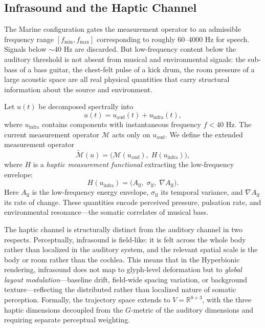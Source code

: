 \documentclass[12pt, a4paper]{article}
\begin{document}
\subsection{Infrasound and the Haptic Channel}

The Marine configuration gates the measurement operator to an admissible frequency range $[f_{\min}, f_{\max}]$ corresponding to roughly 60--4000 Hz for speech. Signals below $\sim 40$ Hz are discarded. But low-frequency content below the auditory threshold is not absent from musical and environmental signals: the sub-bass of a bass guitar, the chest-felt pulse of a kick drum, the room pressure of a large acoustic space are all real physical quantities that carry structural information about the source and environment.

Let $u(t)$ be decomposed spectrally into
\begin{equation}
u(t) = u_{\mathrm{aud}}(t) + u_{\mathrm{infra}}(t),
\label{eq:decomp_freq}
\end{equation}
where $u_{\mathrm{infra}}$ contains components with instantaneous frequency $f < 40$ Hz. The current measurement operator $\mathcal{M}$ acts only on $u_{\mathrm{aud}}$. We define the extended measurement operator
\begin{equation}
\widetilde{\mathcal{M}}(u) = \bigl(\mathcal{M}(u_{\mathrm{aud}}),\; H(u_{\mathrm{infra}})\bigr),
\label{eq:Mtilde}
\end{equation}
where $H$ is a \emph{haptic measurement functional} extracting the low-frequency envelope:
\begin{equation}
H(u_{\mathrm{infra}}) = \bigl(A_{\mathrm{lf}},\; \sigma_{\mathrm{lf}},\; \nabla A_{\mathrm{lf}}\bigr).
\label{eq:H}
\end{equation}
Here $A_{\mathrm{lf}}$ is the low-frequency energy envelope, $\sigma_{\mathrm{lf}}$ its temporal variance, and $\nabla A_{\mathrm{lf}}$ its rate of change. These quantities encode perceived pressure, pulsation rate, and environmental resonance---the somatic correlates of musical bass.

The haptic channel is structurally distinct from the auditory channel in two respects. Perceptually, infrasound is field-like: it is felt across the whole body rather than localized in the auditory system, and the relevant spatial scale is the body or room rather than the cochlea. This means that in the Hyperbionic rendering, infrasound does not map to glyph-level deformation but to \emph{global layout modulation}---baseline drift, field-wide spacing variation, or background texture---reflecting the distributed rather than localized nature of somatic perception. Formally, the trajectory space extends to $V = \mathbb{R}^{8+3}$, with the three haptic dimensions decoupled from the $G$-metric of the auditory dimensions and requiring separate perceptual weighting.
\end{document}
